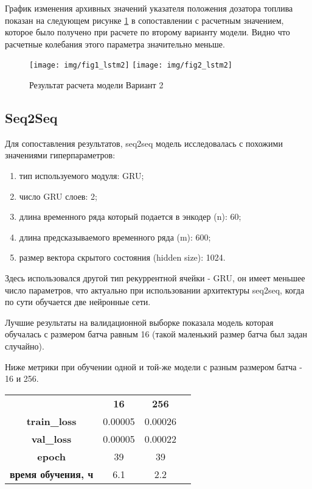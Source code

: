 \documentclass[12pt,a4paper]{article}
\begin{document}
График изменения архивных значений указателя положения дозатора топлива  показан на следующем рисунке \ref{fig:res_lstm2} в сопоставлении с расчетным значением, которое было получено при расчете по второму варианту модели. Видно что расчетные колебания этого параметра значительно меньше.

\begin{figure}[htb]
	\centering\texttt{[image: img/fig1\_lstm2]}
	\centering\texttt{[image: img/fig2\_lstm2]}
	\caption{Результат расчета модели Вариант 2}
	\label{fig:res_lstm2}
\end{figure}


\subsection{Seq2Seq}

\begin{description}
	\item Для сопоставления результатов, seq2seq модель исследовалась с похожими значениями гиперпараметров:
	\begin{enumerate}
		\item тип используемого модуля: GRU;
		\item число GRU слоев: 2;
		\item длина временного ряда который подается в энкодер (n): 60;
		\item длина предсказываемого временного ряда (m): 600;
		\item размер вектора скрытого состояния (hidden size): 1024.	
	\end{enumerate}
\end{description}

Здесь использовался другой тип рекуррентной ячейки - GRU, он имеет меньшее число параметров, что актуально при использовании архитектуры seq2seq, когда по сути обучается две нейронные сети.

Лучшие результаты на валидационной выборке показала модель которая обучалась с размером батча равным 16 (такой маленький размер батча был задан случайно).

Ниже метрики при обучении одной и той-же модели с разным размером батча - 16 и 256.

\begin{center}
	\begin{tabular}{ |c|c|c|c| } 
		\hline
		& {\bf 16} & {\bf 256} \\ 
		{\bf train\_loss} & 0.00005 & 0.00026 \\ 
		{\bf val\_loss} & 0.00005 & 0.00022 \\
		{\bf epoch} & 39 & 39 \\
		{\bf время обучения, ч} & 6.1 & 2.2 \\
		\hline
	\end{tabular}
\end{center}
\end{document}
